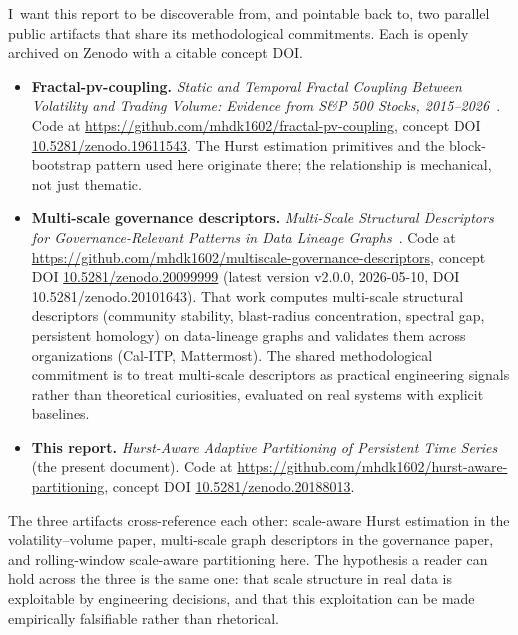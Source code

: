 \documentclass[11pt]{article}
\begin{document}
I~want this report to be discoverable from, and pointable back to, two parallel public artifacts that share its methodological commitments. Each is openly archived on Zenodo with a citable concept DOI.

\begin{itemize}
\item \textbf{Fractal-pv-coupling.} \emph{Static and Temporal Fractal Coupling Between Volatility and Trading Volume: Evidence from S\&P 500 Stocks, 2015--2026}~\cite{malempatihari2026fractal}. Code at \url{https://github.com/mhdk1602/fractal-pv-coupling}, concept DOI \href{https://doi.org/10.5281/zenodo.19611543}{10.5281/zenodo.19611543}. The Hurst estimation primitives and the block-bootstrap pattern used here originate there; the relationship is mechanical, not just thematic.
\item \textbf{Multi-scale governance descriptors.} \emph{Multi-Scale Structural Descriptors for Governance-Relevant Patterns in Data Lineage Graphs}~\cite{malempatihari2026governance}. Code at \url{https://github.com/mhdk1602/multiscale-governance-descriptors}, concept DOI \href{https://doi.org/10.5281/zenodo.20099999}{10.5281/zenodo.20099999} (latest version v2.0.0, 2026-05-10, DOI 10.5281/zenodo.20101643). That work computes multi-scale structural descriptors (community stability, blast-radius concentration, spectral gap, persistent homology) on data-lineage graphs and validates them across organizations (Cal-ITP, Mattermost). The shared methodological commitment is to treat multi-scale descriptors as practical engineering signals rather than theoretical curiosities, evaluated on real systems with explicit baselines.
\item \textbf{This report.} \emph{Hurst-Aware Adaptive Partitioning of Persistent Time Series} (the present document). Code at \url{https://github.com/mhdk1602/hurst-aware-partitioning}, concept DOI \href{https://doi.org/10.5281/zenodo.20188013}{10.5281/zenodo.20188013}.
\end{itemize}

The three artifacts cross-reference each other: scale-aware Hurst estimation in the volatility--volume paper, multi-scale graph descriptors in the governance paper, and rolling-window scale-aware partitioning here. The hypothesis a reader can hold across the three is the same one: that scale structure in real data is exploitable by engineering decisions, and that this exploitation can be made empirically falsifiable rather than rhetorical.
\end{document}
